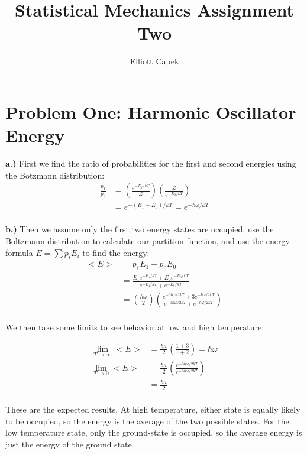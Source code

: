 \documentclass[10pt]{article} %
\title{Statistical Mechanics Assignment Two}
\author{Elliott Capek}
\begin{document}
\maketitle{}

\section{Problem One: Harmonic Oscillator Energy}
\textbf{a.)} First we find the ratio of probabilities for the first and
second energies using the Botzmann distribution:\\
\begin{align*}
  \frac{p_1}{p_0} &= \left(\frac{e^{-E_1/kT}}{Z}\right)
  \left(\frac{Z}{e^{-E_0/kT}}\right)\\
  &= e^{-(E_1-E_0)/kT} = e^{-\hbar\omega/kT}\\
\end{align*}

\textbf{b.)} Then we assume only the first two energy states are occupied, use the
Boltzmann distribution to calculate our partition function, and use the energy formula
$E = \sum p_iE_i$ to find the energy:\\

\begin{align*}
  <E> &= p_1E_1 + p_0E_0\\
  &= \frac{E_1e^{-E_1/kT} + E_0e^{-E_0/kT}}{e^{-E_1/kT} + e^{-E_0/kT}}\\
  &= \left(\frac{\hbar\omega}{2}\right)
  \left(\frac{e^{-3\hbar\omega/2kT} + 3e^{-\hbar\omega/2kT}}{e^{-3\hbar\omega/2kT}
    + e^{-\hbar\omega/2kT}}\right)\\
\end{align*}

We then take some limits to see behavior at low and high temperature:

\begin{align*}
  \lim_{T\rightarrow\infty} <E> &= \frac{\hbar\omega}{2}\left(\frac{1+3}{1+2}\right)
  = \hbar\omega\\
  \lim_{T\rightarrow 0} <E> &= \frac{\hbar\omega}{2}
  \left(\frac{e^{-3\hbar\omega/2kT}}{e^{-3\hbar\omega/2kT}}\right)\\
  &= \frac{\hbar\omega}{2}\\
\end{align*}

These are the expected results. At high temperature, either state is equally likely
to be occupied, so the energy is the average of the two possible states. For the low
temperature state, only the ground-state is occupied, so the average energy is just
the energy of the ground state.\\
\end{document}
